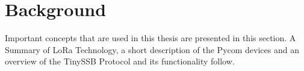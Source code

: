 \chapter{Background}










Important concepts that are used in this thesis are presented in this section. A Summary of LoRa Technology, a short description of the Pycom devices and an overview of the TinySSB Protocol and its functionality follow.
